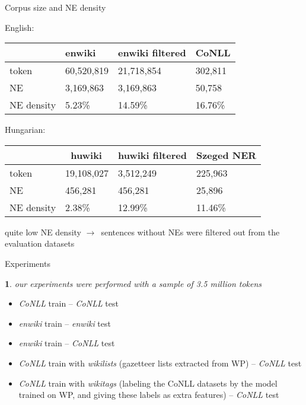 \documentclass[utf8x,t]{beamer}
\newcommand{\nyil}{$\rightarrow$\ }
\newtheorem{nix}{}[section]
\begin{document}
\begin{frame}{Corpus size and NE density}

English: 

\begin{center}
\begin{tabular}{llll}
\hline  & \bf enwiki & \bf enwiki filtered & \bf CoNLL \\ \hline
token & 60,520,819 & 21,718,854 & 302,811 \\
NE & 3,169,863 & 3,169,863 & 50,758 \\
NE density & 5.23\% & 14.59\% & 16.76\% \\ \hline
\end{tabular}
\end{center}


Hungarian:

\begin{center}
\begin{tabular}{llll}
\hline  & \bf huwiki & \bf huwiki filtered  & \bf Szeged NER \\ \hline
token & 19,108,027 & 3,512,249  & 225,963 \\
NE & 456,281 & 456,281  & 25,896 \\
NE density & 2.38\% & 12.99\%  & 11.46\% \\ \hline 
\end{tabular}
\end{center}

quite low NE density \nyil sentences without NEs were filtered out from the evaluation datasets

\end{frame}

\begin{frame}{Experiments}

\begin{nix}
our experiments were performed with a sample of 3.5 million tokens
\end{nix}

\bigskip

\begin{itemize}
\item \textit{CoNLL} train -- \textit{CoNLL} test
\item \textit{enwiki} train -- \textit{enwiki} test
\item \textit{enwiki} train -- \textit{CoNLL} test
\item \textit{CoNLL} train with \textit{wikilists} (gazetteer lists extracted from WP) -- \textit{CoNLL} test
\item \textit{CoNLL} train with \textit{wikitags} (labeling the CoNLL datasets by the model trained on WP, and giving these labels as extra features) -- \textit{CoNLL} test
\end{itemize}

\end{frame}
\end{document}
